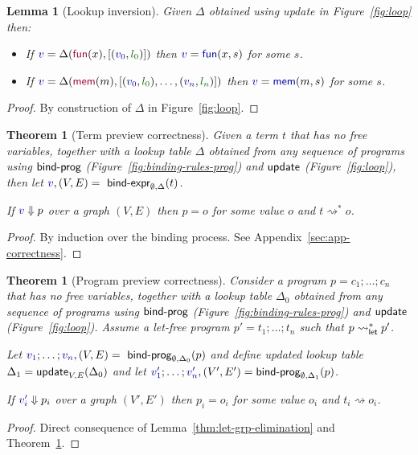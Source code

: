 \documentclass[english,submission]{programming}
\newcounter{thc}
\theoremstyle{plain}
\newtheorem{lem}[thc]{Lemma}
\newtheorem{theorem}[thc]{Theorem}
\theoremstyle{definition}
\newcommand{\ident}[1]{\textnormal{\textcolor{idclr}{\sffamily #1}}}
\newcommand{\bndclr}[1]{\textcolor{kvdclr}{#1}}
\newcommand{\blblclr}[1]{\textcolor{numclr}{#1}}
\newcommand{\bnd}[1]{\textnormal{\textcolor{kvdclr}{\sffamily #1}}}
\newcommand{\bknd}[1]{\textnormal{\textcolor{prepclr}{\sffamily #1}}}
\begin{document}
\begin{lem}[Lookup inversion]
\label{thm:lemma-lookup}
Given $\Delta$ obtained using \ident{update} in Figure~\ref{fig:loop} then:
\begin{itemize}
\raggedright
\item[--] If $\bndclr{v}=\Delta(\bknd{fun}(x),[(\bndclr{v_0}, \blblclr{l_0})])$
then $\bndclr{v}=\bnd{fun}(x, s)$ for some $s$.
\item[--] If $\bndclr{v}=\Delta(\bknd{mem}(m),[(\bndclr{v_0}, \blblclr{l_0}), \ldots, (\bndclr{v_n}, \blblclr{l_n})])$
then $\bndclr{v}=\bnd{mem}(m, s)$ for some $s$.
\end{itemize}
\end{lem}
\begin{proof}
By construction of $\Delta$ in Figure~\ref{fig:loop}.
\end{proof}

\begin{theorem}[Term preview correctness]
\label{thm:let-free-correct}
Given a term $t$ that has no free variables, together with a lookup table $\Delta$ obtained
from any sequence of programs using $\ident{bind-prog}$ (Figure~\ref{fig:binding-rules-prog}) and
$\ident{update}$ (Figure~\ref{fig:loop}), then
let $\bndclr{v}, (V, E) = \ident{bind-expr}_{\emptyset, \Delta}(t)$.

\vspace{0.25em}
\noindent
If $\bndclr{v}\Downarrow p$
over a graph $(V, E)$ then $p = o$ for some value $o$ and $t \rightsquigarrow^{*} o$.
\end{theorem}

\begin{proof}
By induction over the binding process. See Appendix~\ref{sec:app-correctness}.
\end{proof}

\begin{theorem}[Program preview correctness]
\label{thm:correcntess}
Consider a program $p=c_1;\ldots;c_n$ that has no free variables, together with a lookup table
$\Delta_0$ obtained from any sequence of programs using $\ident{bind-prog}$
(Figure~\ref{fig:binding-rules-prog}) and $\ident{update}$ (Figure~\ref{fig:loop}). Assume a
let-free program $p'=t_1;\ldots;t_n$ such that $p\rightsquigarrow^{*}_\ident{let}p'$.

\vspace{0.25em}
\noindent
Let $\bndclr{v_1};\ldots;\bndclr{v_n}, (V, E) = \ident{bind-prog}_{\emptyset, \Delta_0}(p)$
and define updated lookup table $\Delta_1=\ident{update}_{V, E}(\Delta_0)$ and
let $\bndclr{v'_1};\ldots;\bndclr{v'_n}, (V', E') = \ident{bind-prog}_{\emptyset, \Delta_1}(p)$.

\vspace{0.25em}
\noindent
If $\bndclr{v'_i}\Downarrow p_i$ over a graph $(V', E')$ then $p_i=o_i$ for some value $o_i$ and
$t_i \rightsquigarrow o_i$.
\end{theorem}
\begin{proof}
Direct consequence of Lemma~\ref{thm:let-grp-elimination} and Theorem~\ref{thm:let-free-correct}.
\end{proof}
\end{document}
